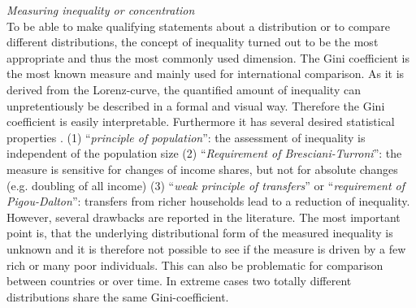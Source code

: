\documentclass[twoside]{article}\usepackage[]{graphicx}\usepackage[]{color}
\begin{document}
\begin{multicols}{2}

\emph{Measuring inequality or concentration} \\
To be able to make qualifying statements about a distribution or to compare different distributions, the concept of inequality turned out to be the most appropriate and thus the most commonly used dimension. The Gini coefficient is the most known measure and mainly used for international comparison. As it is derived from the Lorenz-curve, the quantified amount of inequality can unpretentiously be described in a formal and visual way. Therefore the Gini coefficient is easily interpretable. Furthermore it has several desired statistical properties \citet{engelhardt_modelle_2000}. (1) ``\textit{principle of population}'': the assessment of inequality is independent of the population size (2) ``\textit{Requirement of Bresciani-Turroni}'': the measure is sensitive for changes of income shares, but not for absolute changes (e.g. doubling of all income) (3) ``\textit{weak principle of transfers}'' or ``\textit{requirement of Pigou-Dalton}'': transfers from richer households lead to a reduction of inequality. However, several drawbacks are reported in the literature. The most important point is, that the underlying distributional form of the measured inequality is unknown and it is therefore not possible to see if the measure is driven by a few rich or many poor individuals. This can also be problematic for comparison between countries or over time. In extreme cases two totally different distributions share the same Gini-coefficient.\\



\end{multicols}
\end{document}
